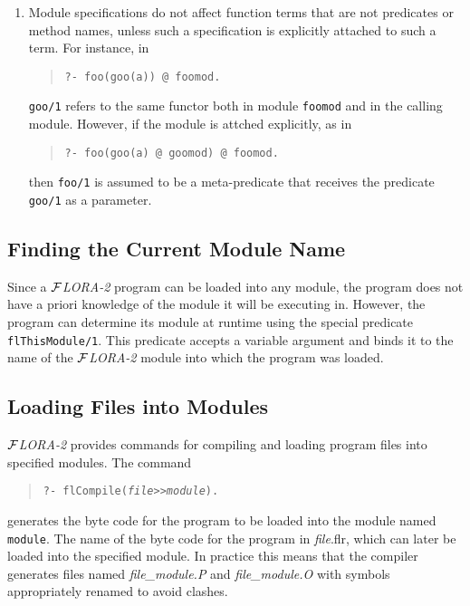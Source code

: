 \documentclass[11pt]{article}
\newcommand{\FLORA}{{\mbox{${\cal F}${\small\it LORA}\rm\emph{-2}}}\xspace}
\begin{document}
\begin{enumerate}
\item Module specifications do not affect function terms that are not
  predicates or method names, unless such a specification is explicitly
  attached to such a term. For instance, in
  \begin{quote}
    \verb|?- foo(goo(a)) @ foomod.|
  \end{quote}
  {\tt goo/1} refers to the same functor both in module {\tt foomod} and in
  the calling module. However, if the module is attched explicitly, as in
  \begin{quote}
    \verb|?- foo(goo(a) @ goomod) @ foomod.|
  \end{quote}
  then {\tt foo/1} is assumed to be a meta-predicate that receives the
  predicate {\tt goo/1}  as a parameter.
\end{enumerate}


\subsection{Finding the Current Module Name}

%
Since a \FLORA program can be loaded into any module, the program does not
have a priori knowledge of the module it will be executing in. However, the
program can determine its module at runtime using the special predicate
{\tt flThisModule/1}.  This predicate accepts a variable argument and binds
it to the name of the \FLORA module into which the program was loaded.




\subsection{Loading Files into Modules}\label{sec-loading-mods}

%

\FLORA provides commands for compiling and loading program files into
specified modules.
The
command 
\begin{quote}
  {\tt ?- flCompile({\it file}>>{\it module}).}
\end{quote}
generates the byte code for the program to be loaded into the module named
{\tt module}. The name of the byte code for the program in \emph{file}.flr,
which can later be loaded into the specified module. In practice this means
that the compiler generates files named \emph{file\_module.P} and
\emph{file\_module.O} with symbols appropriately renamed to avoid clashes.
\end{document}
